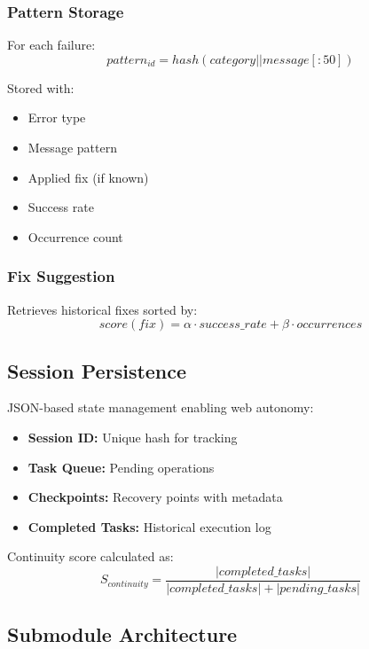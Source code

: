 \documentclass{article}
\begin{document}
\subsubsection{Pattern Storage}
For each failure:
\begin{equation}
    pattern_{id} = hash(category || message[:50])
\end{equation}

Stored with:
\begin{itemize}
    \item Error type
    \item Message pattern
    \item Applied fix (if known)
    \item Success rate
    \item Occurrence count
\end{itemize}

\subsubsection{Fix Suggestion}
Retrieves historical fixes sorted by:
\begin{equation}
    score(fix) = \alpha \cdot success\_rate + \beta \cdot occurrences
\end{equation}

\subsection{Session Persistence}

JSON-based state management enabling web autonomy:

\begin{itemize}
    \item \textbf{Session ID:} Unique hash for tracking
    \item \textbf{Task Queue:} Pending operations
    \item \textbf{Checkpoints:} Recovery points with metadata
    \item \textbf{Completed Tasks:} Historical execution log
\end{itemize}

Continuity score calculated as:
\begin{equation}
    S_{continuity} = \frac{|completed\_tasks|}{|completed\_tasks| + |pending\_tasks|}
\end{equation}

\subsection{Submodule Architecture}
\end{document}
